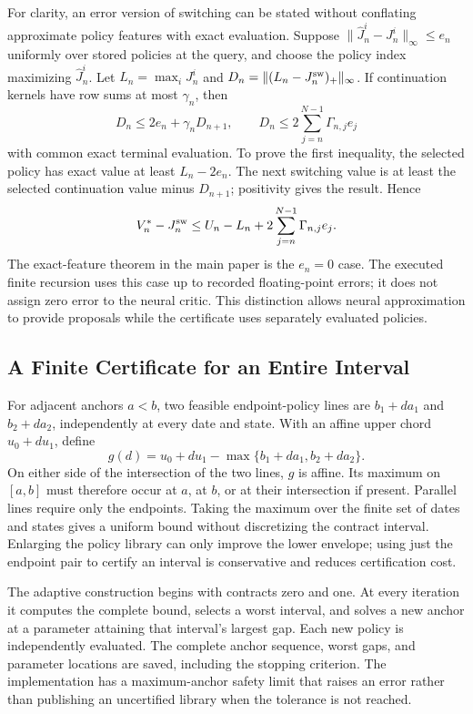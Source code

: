 For clarity, an error version of switching can be stated without conflating approximate policy features with exact evaluation. Suppose $\|\widehat J^i_n-J^i_n\|_\infty\leq e_n$ uniformly over stored policies at the query, and choose the policy index maximizing $\widehat J^i_n$. Let $L_n=\max_iJ^i_n$ and $D_n=\|(L_n-J_n^{\rm sw})_+\|_\infty$. If continuation kernels have row sums at most $\gamma_n$, then
\begin{equation}
 D_n\leq 2e_n+\gamma_nD_{n+1},\qquad
 D_n\leq2\sum_{j=n}^{N-1}\Gamma_{n,j}e_j
 \label{eq:supp_switch_error}
\end{equation}
with common exact terminal evaluation. To prove the first inequality, the selected policy has exact value at least $L_n-2e_n$. The next switching value is at least the selected continuation value minus $D_{n+1}$; positivity gives the result. Hence
\[
 V_n^*-J_n^{\rm sw}\leq U_n-L_n+
 2\sum_{j=n}^{N-1}\Gamma_{n,j}e_j.
\]
The exact-feature theorem in the main paper is the $e_n=0$ case. The executed finite recursion uses this case up to recorded floating-point errors; it does not assign zero error to the neural critic. This distinction allows neural approximation to provide proposals while the certificate uses separately evaluated policies.

\subsection{A Finite Certificate for an Entire Interval}
For adjacent anchors $a<b$, two feasible endpoint-policy lines are $b_1+d a_1$ and $b_2+d a_2$, independently at every date and state. With an affine upper chord $u_0+d u_1$, define
\[
 g(d)=u_0+d u_1-\max\{b_1+d a_1,b_2+d a_2\}.
\]
On either side of the intersection of the two lines, $g$ is affine. Its maximum on $[a,b]$ must therefore occur at $a$, at $b$, or at their intersection if present. Parallel lines require only the endpoints. Taking the maximum over the finite set of dates and states gives a uniform bound without discretizing the contract interval. Enlarging the policy library can only improve the lower envelope; using just the endpoint pair to certify an interval is conservative and reduces certification cost.

The adaptive construction begins with contracts zero and one. At every iteration it computes the complete bound, selects a worst interval, and solves a new anchor at a parameter attaining that interval's largest gap. Each new policy is independently evaluated. The complete anchor sequence, worst gaps, and parameter locations are saved, including the stopping criterion. The implementation has a maximum-anchor safety limit that raises an error rather than publishing an uncertified library when the tolerance is not reached.


